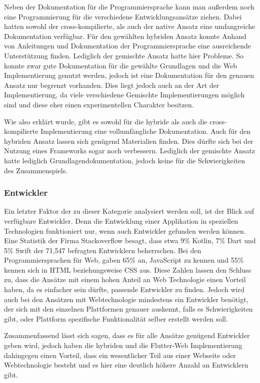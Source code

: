 Neben der Dokumentation für die Programmiersprache kann man außerdem noch eine Programmierung für die verschiedene Entwicklungsansätze ziehen. Dabei hatten sowohl der cross-kompilierte, als auch der native Ansatz eine umfangreiche Dokumentation verfügbar. Für den gewählten hybriden Ansatz konnte Anhand von Anleitungen und Dokumentation der Programmiersprache eine ausreichende Unterstützung finden. Lediglich der gemischte Ansatz hatte hier Probleme. So konnte zwar gute Dokumentation für die gewählte Grundlagen und die Web Implementierung genutzt werden, jedoch ist eine Dokumentation für den genauen Ansatz nur begrenzt vorhanden. Dies liegt jedoch auch an der Art der Implementierung, da viele verschiedene Gemischte Implementierungen möglich sind und diese eher einen experimentellen Charakter besitzen.

Wie also erklärt wurde, gibt es sowohl für die hybride als auch die cross-kompilierte Implementierung eine vollumfängliche Dokumentation. Auch für den hybriden Ansatz lassen sich genügend Materialien finden. Dies dürfte sich bei der Nutzung eines Frameworks sogar noch verbessern. Lediglich der gemischte Ansatz hatte lediglich Grundlagendokumentation, jedoch keine für die Schwierigkeiten des Zusammenspiels. 

\subsubsection{Entwickler}
Ein letzter Faktor der zu dieser Kategorie analysiert werden soll, ist der Blick auf verfügbare Entwickler. Denn die Entwicklung einer Applikation in speziellen Technologien funktioniert nur, wenn auch Entwickler gefunden werden können. Eine Statistik \cite{statist_used_programming_languages} der Firma Stackoverflow besagt, dass etwa 9\% Kotlin, 7\% Dart und 5\% Swift der 71,547 befragten Entwicklern beherrschen.
Bei den Programmiersprachen für Web, gaben  65\% an, JavaScript zu kennen und 55\% kennen sich in HTML beziehungsweise CSS aus. Diese Zahlen lassen den Schluss zu, dass die Ansätze mit einem hohen Anteil an Web Technologie einen Vorteil haben, da es einfacher sein dürfte, passende Entwickler zu finden. Jedoch wird auch bei den Ansätzen mit Webtechnologie mindestens ein Entwickler benötigt, der sich mit den einzelnen Plattformen genauer auskennt, falls es Schwierigkeiten gibt, oder Plattform spezifische Funktionalität selber erstellt werden soll.

Zusammenfassend lässt sich sagen, dass es für alle Ansätze genügend Entwickler geben wird, jedoch haben die hybriden und die Flutter-Web Implementierung dahingegen einen Vorteil, dass ein wesentlicher Teil aus einer Webseite oder Webtechnologie besteht und es hier eine deutlich höhere Anzahl an Entwicklern gibt.

